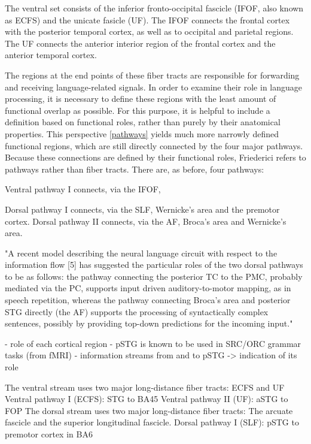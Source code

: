 The ventral set consists of the inferior fronto-occipital fascicle (IFOF, also known as ECFS) and the unicate fasicle (UF).
The IFOF connects the frontal cortex with the posterior temporal cortex, as well as to occipital and parietal regions.
The UF connects the anterior interior region of the frontal cortex and the anterior temporal cortex.

The regions at the end points of these fiber tracts are responsible for forwarding and receiving language-related signals.
In order to examine their role in language processing, it is necessary to define these regions with the least amount of functional overlap as possible.
For this purpose, it is helpful to include a definition based on functional roles, rather than purely by their anatomical properties.
This perspective \ref{pathways} yields much more narrowly defined functional regions, which are still directly connected by the four major pathways.
Because these connections are defined by their functional roles, Friederici refers to pathways rather than fiber tracts.
There are, as before, four pathways:

Ventral pathway I connects, via the IFOF, 

Dorsal pathway I connects, via the SLF, Wernicke's area and the premotor cortex.
Dorsal pathway II connects, via the AF, Broca's area and Wernicke's area.

"A recent model describing the neural language circuit with respect to the information flow [5] has suggested the particular roles of the two dorsal pathways to be as follows: the pathway connecting the posterior TC to the PMC, probably mediated via the PC, supports input driven auditory-to-motor mapping, as in speech repetition, whereas the pathway connecting Broca’s area and posterior STG directly (the AF) supports the processing of syntactically complex sentences, possibly by providing top-down predictions for the incoming input."

- role of each cortical region
- pSTG is known to be used in SRC/ORC grammar tasks (from fMRI)
- information streams from and to pSTG -> indication of its role

The ventral stream uses two major long-distance fiber tracts: ECFS and UF
Ventral pathway I (ECFS): STG to BA45
Ventral pathway II (UF): aSTG to FOP
The dorsal stream uses two major long-distance fiber tracts: The arcuate fascicle and the superior longitudinal fascicle.
Dorsal pathway I (SLF): pSTG to premotor cortex in BA6

